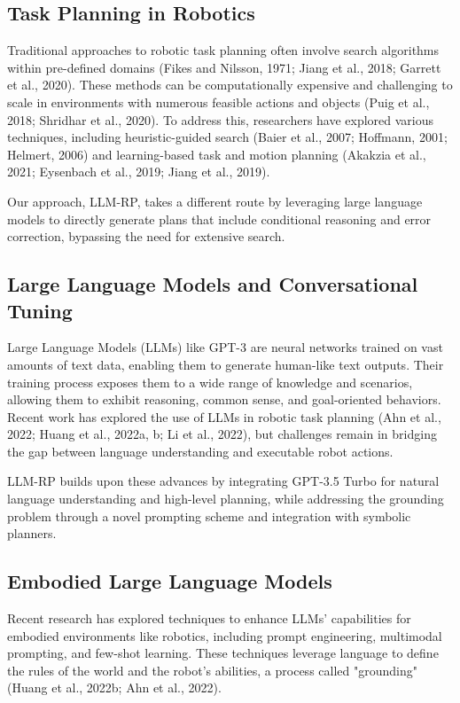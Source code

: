 \documentclass[pdflatex,sn-mathphys-num]{sn-jnl}%
\theoremstyle{thmstyleone}
\theoremstyle{thmstyletwo}%
\theoremstyle{thmstylethree}%
\begin{document}
\subsection{Task Planning in Robotics}

Traditional approaches to robotic task planning often involve search algorithms within pre-defined domains (Fikes and Nilsson, 1971; Jiang et al., 2018; Garrett et al., 2020). These methods can be computationally expensive and challenging to scale in environments with numerous feasible actions and objects (Puig et al., 2018; Shridhar et al., 2020). To address this, researchers have explored various techniques, including heuristic-guided search (Baier et al., 2007; Hoffmann, 2001; Helmert, 2006) and learning-based task and motion planning (Akakzia et al., 2021; Eysenbach et al., 2019; Jiang et al., 2019).

Our approach, LLM-RP, takes a different route by leveraging large language models to directly generate plans that include conditional reasoning and error correction, bypassing the need for extensive search.

\subsection{Large Language Models and Conversational Tuning}

Large Language Models (LLMs) like GPT-3 are neural networks trained on vast amounts of text data, enabling them to generate human-like text outputs. Their training process exposes them to a wide range of knowledge and scenarios, allowing them to exhibit reasoning, common sense, and goal-oriented behaviors. Recent work has explored the use of LLMs in robotic task planning (Ahn et al., 2022; Huang et al., 2022a, b; Li et al., 2022), but challenges remain in bridging the gap between language understanding and executable robot actions.

LLM-RP builds upon these advances by integrating GPT-3.5 Turbo for natural language understanding and high-level planning, while addressing the grounding problem through a novel prompting scheme and integration with symbolic planners.

\subsection{Embodied Large Language Models}

Recent research has explored techniques to enhance LLMs' capabilities for embodied environments like robotics, including prompt engineering, multimodal prompting, and few-shot learning. These techniques leverage language to define the rules of the world and the robot's abilities, a process called "grounding" (Huang et al., 2022b; Ahn et al., 2022).
\end{document}

